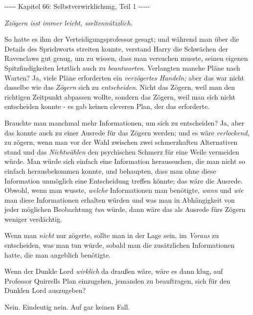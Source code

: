 

\hypertarget{selbstverwirklichung-teil-1}{%

-\/-\/-\/-\/- Kapitel 66: Selbstverwirklichung, Teil 1 -\/-\/-\/-\/-

\emph{\emph{Zzögern} \emph{isst immer leicht,} \emph{sseltennützzlich.}}

So hatte es ihm der Verteidigungsprofessor gesagt; und während man über die Details des Sprichworts streiten konnte, verstand Harry die Schwächen der Ravenclaws gut genug, um zu wissen, dass man versuchen musste, seinen eigenen Spitzfindigkeiten letztlich auch zu \emph{beantworten}. Verlangten manche Pläne nach Warten? Ja, viele Pläne erforderten ein \emph{verzögertes Handeln;} aber das war nicht dasselbe wie das \emph{Zögern} sich zu \emph{entscheiden}. Nicht das Zögern, weil man den richtigen Zeitpunkt abpassen wollte, sondern das Zögern, weil man sich nicht entscheiden konnte - es gab keinen cleveren Plan, der das erforderte.

Brauchte man manchmal mehr Informationen, um sich zu entscheiden? Ja, aber das konnte auch zu einer Ausrede für das Zögern werden; und es wäre \emph{verlockend}, zu zögern, wenn man vor der Wahl zwischen zwei schmerzhaften Alternativen stand und das \emph{Nichtwählen} den psychischen Schmerz für eine Weile vermeiden würde. Man würde sich einfach eine Information heraussuchen, die man nicht so einfach herausbekommen konnte, und behaupten, dass man ohne diese Information unmöglich eine Entscheidung treffen könnte; das wäre die Ausrede. Obwohl, wenn man wusste, \emph{welche} Informationen man benötigte, \emph{wann} und \emph{wie} man diese Informationen erhalten würden und was man in Abhängigkeit von jeder möglichen Beobachtung \emph{tun} würde, dann wäre das als Ausrede fürs Zögern weniger verdächtig.

Wenn man \emph{nicht} nur zögerte, sollte man in der Lage sein, im \emph{Voraus} zu entscheiden, was man tun würde, sobald man die zusätzlichen Informationen hatte, die man angeblich benötigte.

Wenn der Dunkle Lord \emph{wirklich} da draußen wäre, wäre es dann klug, auf Professor Quirrells Plan einzugehen, jemanden zu beauftragen, sich für den Dunklen Lord auszugeben?

Nein. Eindeutig nein. Auf gar keinen Fall.

}
